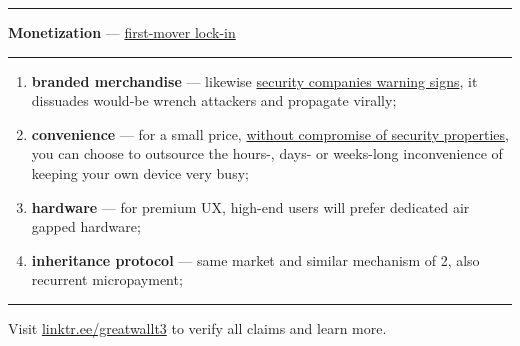 \documentclass[8pt]{article}
\newcommand{\faqurl}{https://tr.ee/gwfaq}
\newcommand{\privsecplaque}{https://duckduckgo.com/?q=prosegur+verisure+\%22warning+sign\%22+facade\&iar=images\&t=brave\&iaf=type\%3Aphoto}
\begin{document}
{\color{accent}\hrule}
\vspace{0.2cm}
{\Large\textbf{Monetization} --- \href{\faqurl}{first-mover lock-in}}
\vspace{0.2cm}
{\color{accent}\hrule}
\vspace{0.3cm}

\begin{enumerate}
 \item \textbf{branded merchandise} --- likewise \href{\privsecplaque}{security companies warning signs}, it dissuades would-be wrench attackers and propagate virally;
 \item \textbf{convenience} --- for a small price, \href{\faqurl}{without compromise of security properties}, you can choose to outsource the hours-, days- or weeks-long inconvenience of keeping your own device very busy;
 \item \textbf{hardware} --- for premium UX, high-end users will prefer dedicated air gapped hardware;
 \item \textbf{inheritance protocol} --- same market and similar mechanism of 2, also recurrent micropayment;
\end{enumerate}


\noindent
{\color{accent}\rule{\linewidth}{0.5mm}}
\begin{center}
Visit \href{https://linktr.ee/greatwallt3}{linktr.ee/greatwallt3} to verify all claims and learn more.
\end{center}
\end{document}
